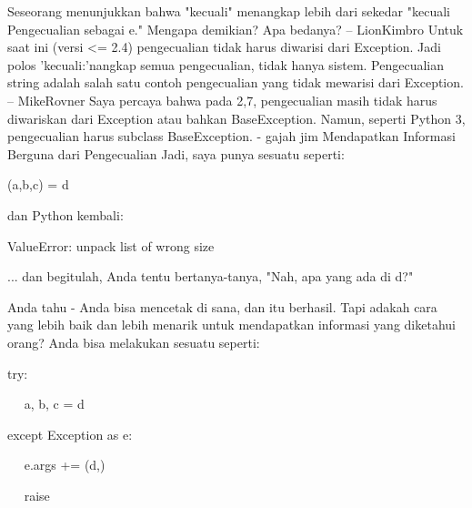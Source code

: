  \hspace*{0.64in} Seseorang menunjukkan bahwa "kecuali" menangkap lebih dari sekedar "kecuali Pengecualian sebagai e." Mengapa demikian? Apa bedanya? – LionKimbro Untuk saat ini (versi <= 2.4) pengecualian tidak harus diwarisi dari Exception. Jadi polos 'kecuali:'nangkap semua pengecualian, tidak hanya sistem. Pengecualian string adalah salah satu contoh pengecualian yang tidak mewarisi dari Exception. – MikeRovner Saya percaya bahwa pada 2,7, pengecualian masih tidak harus diwariskan dari Exception atau bahkan BaseException. Namun, seperti Python 3, pengecualian harus subclass BaseException. - gajah jim Mendapatkan Informasi Berguna dari Pengecualian Jadi, saya punya sesuatu seperti: 
 
\vspace{12pt}


{\fontsize{10pt}{10pt}\selectfont  (a,b,c) = d} 

\vspace{12pt}
 
dan Python kembali: 
 
\vspace{12pt}
 
 
{\fontsize{10pt}{10pt}\selectfont  ValueError: unpack list of wrong size} 
\vspace{16pt}

... dan begitulah, Anda tentu bertanya-tanya, "Nah, apa yang ada di d?" 

\vspace{12pt}

Anda tahu - Anda bisa mencetak di sana, dan itu berhasil. Tapi adakah cara yang lebih baik dan lebih menarik untuk mendapatkan informasi yang diketahui orang? Anda bisa melakukan sesuatu seperti: 
\vspace{20pt}

 
 try: 
 
 
~~ a, b, c = d 
 
 
 except Exception as e: 
 
 
~~ e.args += (d,) 
 
 
~~ raise 
\vspace{20pt}
 
